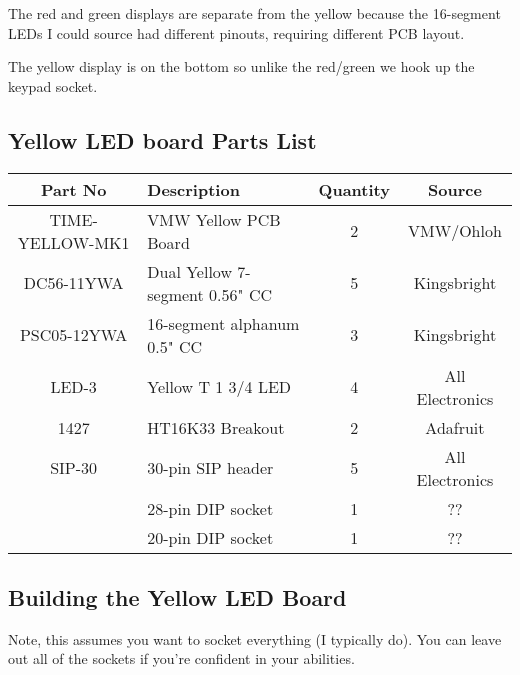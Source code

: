 \documentclass[11pt]{article}
\begin{document}
The red and green displays are separate from the yellow because
the 16-segment LEDs I could source had different pinouts, requiring
different PCB layout.

The yellow display is on the bottom so unlike the red/green we
hook up the keypad socket.

\subsection{Yellow LED board Parts List}

\begin{tabular}{|c|l|c|c|}
\hline
Part No   &  Description    &  Quantity    &   Source \\
\hline
\hline
TIME-YELLOW-MK1& VMW Yellow PCB Board          & 2 & VMW/Ohloh\\ %
\hline
DC56-11YWA     & Dual Yellow 7-segment 0.56" CC& 5 & Kingsbright\\ %
\hline
PSC05-12YWA    & 16-segment alphanum 0.5" CC   & 3 & Kingsbright\\ %
\hline
LED-3          & Yellow T 1 3/4 LED            & 4 & All Electronics\\ %
\hline
1427           & HT16K33 Breakout              & 2 & Adafruit\\ %
\hline
SIP-30	       & 30-pin SIP header             & 5 & All Electronics\\ %
\hline
               & 28-pin DIP socket             & 1 & ?? \\ %
\hline
               & 20-pin DIP socket             & 1 & ?? \\ %
\hline
\end{tabular}


\subsection{Building the Yellow LED Board}

Note, this assumes you want to socket everything (I typically do).
You can leave out all of the sockets if you're confident in your
abilities.
\end{document}
